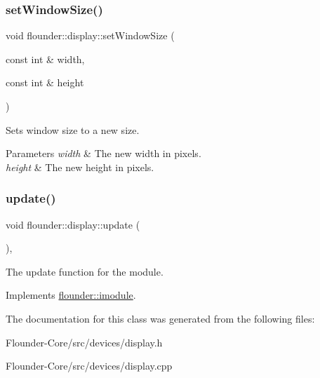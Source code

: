 \subsubsection{\texorpdfstring{set\+Window\+Size()}{setWindowSize()}}
{\footnotesize\ttfamily void flounder\+::display\+::set\+Window\+Size (\begin{DoxyParamCaption}\item[{const int \&}]{width,  }\item[{const int \&}]{height }\end{DoxyParamCaption})}



Sets window size to a new size. 


\begin{DoxyParams}{Parameters}
{\em width} & The new width in pixels. \\
\hline
{\em height} & The new height in pixels. \\
\hline
\end{DoxyParams}
\mbox{\label{classflounder_1_1display_a799c6a76fcac1a0ca56dfd6b8d7993fa}} 
\subsubsection{\texorpdfstring{update()}{update()}}
{\footnotesize\ttfamily void flounder\+::display\+::update (\begin{DoxyParamCaption}{ }\end{DoxyParamCaption})\hspace{0.3cm}{\ttfamily [override]}, {\ttfamily [virtual]}}



The update function for the module. 



Implements \hyperlink{classflounder_1_1imodule_a9a53d48a46b5f6b16a92b2cd8503f74a}{flounder\+::imodule}.



The documentation for this class was generated from the following files\+:\begin{DoxyCompactItemize}
\item 
Flounder-\/\+Core/src/devices/display.\+h\item 
Flounder-\/\+Core/src/devices/display.\+cpp\end{DoxyCompactItemize}
